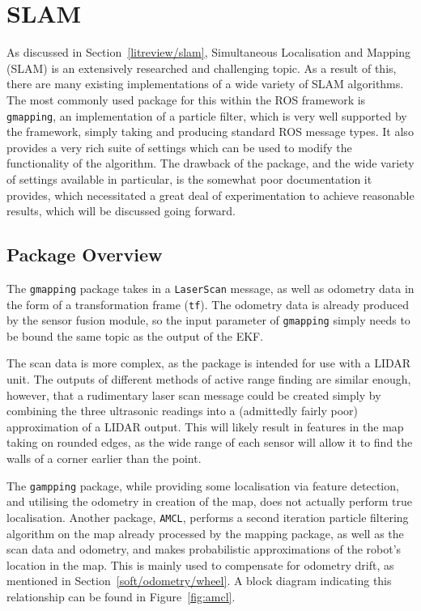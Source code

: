 \section{SLAM}\label{soft/SLAM}

As discussed in Section~\ref{litreview/slam}, Simultaneous Localisation and Mapping (SLAM) is an extensively 
researched and challenging topic. As a result of this, there are many existing implementations of a wide
variety of SLAM algorithms. The most commonly used package for this within the ROS framework
is \verb|gmapping|, an implementation of a particle filter, which is very well supported by the framework,
simply taking and producing standard ROS message types. It also provides a very rich suite of settings which
can be used to modify the functionality of the algorithm. The drawback of the package, and the wide variety
of settings available in particular, is the somewhat poor documentation it provides, which necessitated a
great deal of experimentation to achieve reasonable results, which will be discussed going forward.

\subsection{Package Overview}\label{soft/SLAM/package}

The \verb|gmapping| package takes in a \verb|LaserScan| message, as well as odometry data in the form of a
transformation frame (\verb|tf|). The odometry data is already produced by the sensor fusion module, so the
input parameter of \verb|gmapping| simply needs to be bound the same topic as the output of the EKF.

The scan data is more complex, as the package is intended for use with a LIDAR unit. The outputs of different
methods of active range finding are similar enough, however, that a rudimentary laser scan message could be
created simply by combining the three ultrasonic readings into a (admittedly fairly poor) approximation of a
LIDAR output. This will likely result in features in the map taking on rounded edges, as the wide range of
each sensor will allow it to find the walls of a corner earlier than the point.

The \verb|gampping| package, while providing some localisation via feature detection, and utilising the odometry
in creation of the map, does not actually perform true localisation. Another package, \verb|AMCL|, performs a
second iteration particle filtering algorithm on the map already processed by the mapping package, as well as
the scan data and odometry, and makes probabilistic approximations of the robot's location in the map. This is
mainly used to compensate for odometry drift, as mentioned in Section~\ref{soft/odometry/wheel}. A block diagram
indicating this relationship can be found in Figure~\ref{fig:amcl}.


